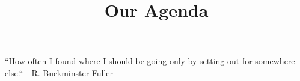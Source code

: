 \documentclass{ximera}
\title{Our Agenda}
\begin{document}
\begin{abstract}

\end{abstract}
\maketitle

``How often I found where I should be going only by setting out for somewhere else.`` - R. Buckminster Fuller
\end{document}
